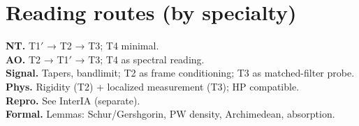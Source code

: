 \section{Reading routes (by specialty)}
\textbf{NT.} T1$′$ → T2 → T3; T4 minimal. \\
\textbf{AO.} T2 → T1$′$ → T3; T4 as spectral reading. \\
\textbf{Signal.} Tapers, bandlimit; T2 as frame conditioning; T3 as matched-filter probe. \\
\textbf{Phys.} Rigidity (T2) + localized measurement (T3); HP compatible. \\
\textbf{Repro.} See InterIA (separate). \\
\textbf{Formal.} Lemmas: Schur/Gershgorin, PW density, Archimedean, absorption.
